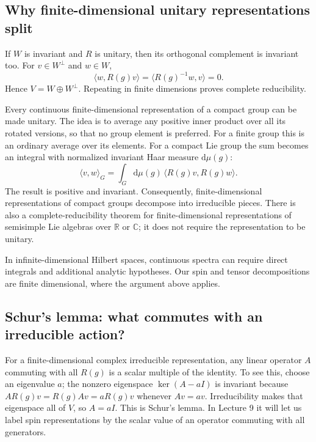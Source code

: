 \documentclass[11pt]{article}
\newcommand{\dd}{\mathrm{d}}
\newcommand{\R}{\mathbb{R}}
\newcommand{\C}{\mathbb C}
\begin{document}
\subsection{Why finite-dimensional unitary representations split}
If \(W\) is invariant and \(R\) is unitary, then its orthogonal
complement is invariant too. For \(v\in W^\perp\) and \(w\in W\),
\begin{equation}
\langle w,R(g)v\rangle
=\langle R(g)^{-1}w,v\rangle=0.
\end{equation}
Hence \(V=W\oplus W^\perp\). Repeating in finite dimensions proves
complete reducibility.

Every continuous finite-dimensional representation of a compact group
can be made unitary. The idea is to average any positive inner product
over all its rotated versions, so that no group element is preferred.
For a finite group this is an ordinary average over its elements. For a
compact Lie group the sum becomes an integral with normalized invariant
Haar measure \(\dd\mu(g)\):
\begin{equation}
\langle v,w\rangle_G=\int_G\dd\mu(g)\,
\langle R(g)v,R(g)w\rangle.
\end{equation}
The result is positive and invariant. Consequently, finite-dimensional
representations of compact groups decompose into irreducible pieces.
There is also a complete-reducibility theorem for finite-dimensional
representations of semisimple Lie algebras over \(\R\) or \(\C\);
it does not require the representation to be unitary.

In infinite-dimensional Hilbert spaces, continuous spectra can require
direct integrals and additional analytic hypotheses. Our spin and tensor
decompositions are finite dimensional, where the argument above applies.

\subsection{Schur's lemma: what commutes with an irreducible action?}
For a finite-dimensional complex irreducible representation, any linear
operator \(A\) commuting with all \(R(g)\) is a scalar multiple of the
identity. To see this, choose an eigenvalue \(a\); the nonzero eigenspace
\(\ker(A-aI)\) is invariant because
\(A R(g)v=R(g)Av=aR(g)v\) whenever \(Av=av\). Irreducibility makes
that eigenspace all of \(V\), so \(A=aI\).
This is Schur's lemma. In Lecture 9 it will let us label spin
representations by the scalar value of an operator commuting with all
generators.
\end{document}
